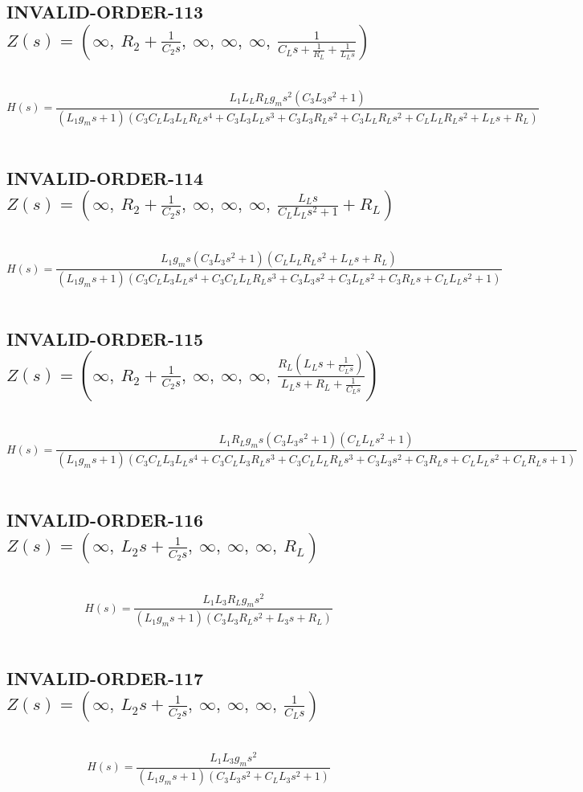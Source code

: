 \documentclass{article}
\begin{document}
\subsection{INVALID-ORDER-113 $Z(s) = \left( \infty, \  R_{2} + \frac{1}{C_{2} s}, \  \infty, \  \infty, \  \infty, \  \frac{1}{C_{L} s + \frac{1}{R_{L}} + \frac{1}{L_{L} s}}\right)$ } \ 
\textbf{\[H(s) = \frac{L_{1} L_{L} R_{L} g_{m} s^{2} \left(C_{3} L_{3} s^{2} + 1\right)}{\left(L_{1} g_{m} s + 1\right) \left(C_{3} C_{L} L_{3} L_{L} R_{L} s^{4} + C_{3} L_{3} L_{L} s^{3} + C_{3} L_{3} R_{L} s^{2} + C_{3} L_{L} R_{L} s^{2} + C_{L} L_{L} R_{L} s^{2} + L_{L} s + R_{L}\right)}\] } \ 
\subsection{INVALID-ORDER-114 $Z(s) = \left( \infty, \  R_{2} + \frac{1}{C_{2} s}, \  \infty, \  \infty, \  \infty, \  \frac{L_{L} s}{C_{L} L_{L} s^{2} + 1} + R_{L}\right)$ } \ 
\textbf{\[H(s) = \frac{L_{1} g_{m} s \left(C_{3} L_{3} s^{2} + 1\right) \left(C_{L} L_{L} R_{L} s^{2} + L_{L} s + R_{L}\right)}{\left(L_{1} g_{m} s + 1\right) \left(C_{3} C_{L} L_{3} L_{L} s^{4} + C_{3} C_{L} L_{L} R_{L} s^{3} + C_{3} L_{3} s^{2} + C_{3} L_{L} s^{2} + C_{3} R_{L} s + C_{L} L_{L} s^{2} + 1\right)}\] } \ 
\subsection{INVALID-ORDER-115 $Z(s) = \left( \infty, \  R_{2} + \frac{1}{C_{2} s}, \  \infty, \  \infty, \  \infty, \  \frac{R_{L} \left(L_{L} s + \frac{1}{C_{L} s}\right)}{L_{L} s + R_{L} + \frac{1}{C_{L} s}}\right)$ } \ 
\textbf{\[H(s) = \frac{L_{1} R_{L} g_{m} s \left(C_{3} L_{3} s^{2} + 1\right) \left(C_{L} L_{L} s^{2} + 1\right)}{\left(L_{1} g_{m} s + 1\right) \left(C_{3} C_{L} L_{3} L_{L} s^{4} + C_{3} C_{L} L_{3} R_{L} s^{3} + C_{3} C_{L} L_{L} R_{L} s^{3} + C_{3} L_{3} s^{2} + C_{3} R_{L} s + C_{L} L_{L} s^{2} + C_{L} R_{L} s + 1\right)}\] } \ 
\subsection{INVALID-ORDER-116 $Z(s) = \left( \infty, \  L_{2} s + \frac{1}{C_{2} s}, \  \infty, \  \infty, \  \infty, \  R_{L}\right)$ } \ 
\textbf{\[H(s) = \frac{L_{1} L_{3} R_{L} g_{m} s^{2}}{\left(L_{1} g_{m} s + 1\right) \left(C_{3} L_{3} R_{L} s^{2} + L_{3} s + R_{L}\right)}\] } \ 
\subsection{INVALID-ORDER-117 $Z(s) = \left( \infty, \  L_{2} s + \frac{1}{C_{2} s}, \  \infty, \  \infty, \  \infty, \  \frac{1}{C_{L} s}\right)$ } \ 
\textbf{\[H(s) = \frac{L_{1} L_{3} g_{m} s^{2}}{\left(L_{1} g_{m} s + 1\right) \left(C_{3} L_{3} s^{2} + C_{L} L_{3} s^{2} + 1\right)}\] } \ 
\end{document}
